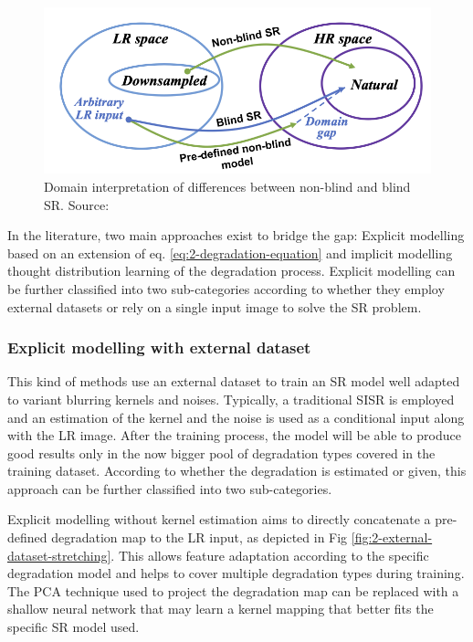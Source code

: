         \begin{figure}[H]
            \centering
            \includegraphics[width=\textwidth]{Includes/2-DomainGap.png}
            \caption{Domain interpretation of differences between non-blind and blind SR. Source: \cite{liu2021blind}}
            \label{fig:2-DomainGap}
        \end{figure}

        In the literature, two main approaches exist to bridge the gap: 
        Explicit modelling based on an extension of eq. \ref{eq:2-degradation-equation} and implicit modelling thought distribution learning of the degradation process.
        Explicit modelling can be further classified into two sub-categories according to whether they employ external datasets or rely on a single input image to solve the SR problem.


        \subsubsection{Explicit modelling with external dataset}

        This kind of methods use an external dataset to train an SR model well adapted to  variant blurring kernels and noises. 
        Typically, a traditional SISR is employed and an estimation of the kernel and the noise is used as a conditional input along with the LR image.
        After the training process, the model will be able to produce good results only in the now bigger pool of degradation types covered in the training dataset.
        According to whether the degradation is estimated or given, this approach can be further classified into two sub-categories.


        Explicit modelling without kernel estimation aims to directly concatenate a pre-defined degradation map to the LR input, as depicted in Fig \ref{fig:2-external-dataset-stretching}. 
        This allows feature adaptation according to the specific degradation model and helps to cover multiple degradation types during training. 
        The PCA technique used to project the degradation map can be replaced with a shallow neural network that may learn a kernel mapping that better fits the specific SR model used.

